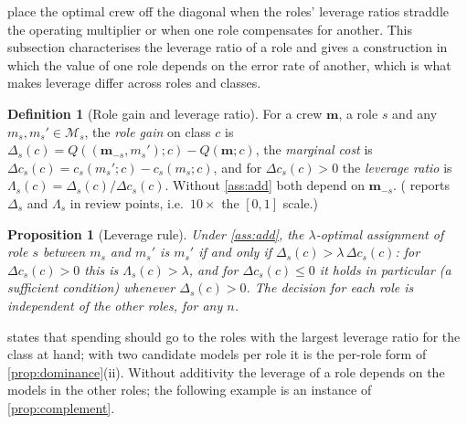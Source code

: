 \documentclass[11pt,a4paper]{article}
\newtheorem{proposition}{Proposition}
\theoremstyle{definition}
\newtheorem{definition}{Definition}
\theoremstyle{remark}
\theoremstyle{definition}
\newcommand{\mods}{\mathcal{M}}
\newcommand{\crew}{\mathbf{m}}
\begin{document}
 place the optimal crew off the diagonal when the roles' leverage ratios straddle the operating multiplier or when one role compensates for another. This subsection characterises the leverage ratio of a role and gives a construction in which the value of one role depends on the error rate of another, which is what makes leverage differ across roles and classes.

\begin{definition}[Role gain and leverage ratio]
\label{def:leverage}
For a crew $\crew$, a role $s$ and any $m_s,m_s'\in\mods_s$, the \emph{role gain} on class $c$ is $\Delta_s(c)=Q((\crew_{-s},m_s');c)-Q(\crew;c)$, the \emph{marginal cost} is $\Delta c_s(c)=c_s(m_s';c)-c_s(m_s;c)$, and for $\Delta c_s(c)>0$ the \emph{leverage ratio} is $\Lambda_s(c)=\Delta_s(c)/\Delta c_s(c)$. Without \cref{ass:add} both depend on $\crew_{-s}$. ( reports $\Delta_s$ and $\Lambda_s$ in review points, i.e.\ $10\times$ the $[0,1]$ scale.)
\end{definition}

\begin{proposition}[Leverage rule]
\label{prop:rule}
Under \cref{ass:add}, the $\lambda$-optimal assignment of role $s$ between $m_s$ and $m_s'$ is $m_s'$ if and only if $\Delta_s(c)>\lambda\,\Delta c_s(c)$: for $\Delta c_s(c)>0$ this is $\Lambda_s(c)>\lambda$, and for $\Delta c_s(c)\le0$ it holds in particular (a sufficient condition) whenever $\Delta_s(c)>0$. The decision for each role is independent of the other roles, for any $n$.
\end{proposition}

 states that spending should go to the roles with the largest leverage ratio for the class at hand; with two candidate models per role it is the per-role form of \cref{prop:dominance}(ii). Without additivity the leverage of a role depends on the models in the other roles; the following example is an instance of \cref{prop:complement}.
\end{document}

